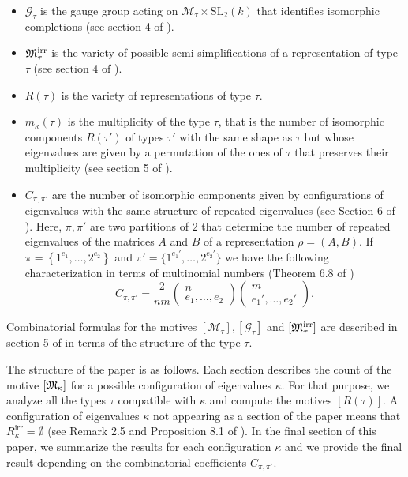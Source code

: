 \documentclass[10pt,a4paper]{amsart}
\begin{document}
\begin{itemize}
	\item $\mathcal{G}_{\tau}$ is the gauge group acting on $\mathcal{M}_{\tau} \times \mathrm{SL}_{2}(k)$ that identifies isomorphic completions (see section 4 of \cite{GPM}).
	\item ${\frak M}_{\tau}^{\textrm{irr}}$ is the variety of possible semi-simplifications of a representation of type $\tau$ (see section 4 of \cite{GPM}).
	\item $R(\tau)$ is the variety of representations of type $\tau$.
	\item $m_{\kappa}(\tau)$ is the multiplicity of the type $\tau$, that is the number of isomorphic components $R(\tau')$ of types $\tau'$ with the same shape as $\tau$ but whose eigenvalues are given by a permutation of the ones of $\tau$ that preserves their multiplicity (see section 5 of \cite{GPM}).
	\item $C_{\pi, \pi'}$ are the number of isomorphic components given by configurations of eigenvalues with the same structure of repeated eigenvalues (see Section 6 of \cite{GPM}). Here, $\pi, \pi'$ are two partitions of ${2}$ that determine the number of repeated eigenvalues of the matrices $A$ and $B$ of a representation $\rho = (A,B)$. If $\pi = \left\{1^{e_1}, \ldots, {2}^{e_{2}}\right\}$ and $\pi' = \big\{1^{e_1'}, \ldots, {2}^{e_{2}'}\big\}$ we have the following characterization in terms of multinomial numbers (Theorem 6.8 of \cite{GPM})
	$$
		C_{\pi, \pi'} = \frac{{2}}{nm} \begin{pmatrix}
	n\\
	e_1, \ldots, e_{2} \end{pmatrix}\begin{pmatrix}
	m\\
	e_1', \ldots, e_{2}'\end{pmatrix}.
	$$
\end{itemize}

Combinatorial formulas for the motives $[\mathcal{M}_{\tau}],[\mathcal{G}_{\tau}]$ and $[{\frak M}_{\tau}^{\textrm{irr}}]$ are described in section 5 of \cite{GPM} in terms of the structure of the type $\tau$.

The structure of the paper is as follows. Each section describes the count of the motive $[{\frak M}_\kappa]$ for a possible configuration of eigenvalues $\kappa$. For that purpose, we analyze all the types $\tau$ compatible with $\kappa$ and compute the motives $[R(\tau)]$. A configuration of eigenvalues $\kappa$ not appearing as a section of the paper means that $R^{\textrm{irr}}_\kappa = \emptyset$ (see Remark {2}.5 and Proposition 8.1 of \cite{GPM}). In the final section of this paper, we summarize the results for each configuration $\kappa$ and we provide the final result depending on the combinatorial coefficients $C_{\pi, \pi'}$.
\end{document}
